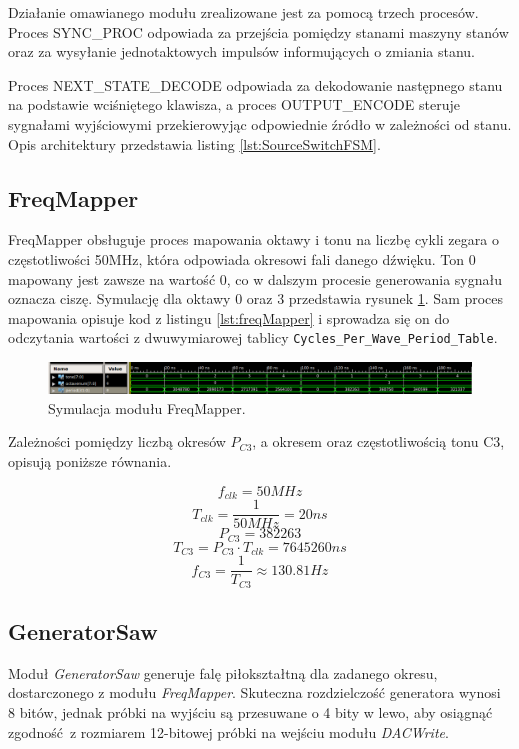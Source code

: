 \documentclass[a4paper,12pt]{article}
\begin{document}
Działanie omawianego modułu zrealizowane jest za pomocą trzech procesów. Proces SYNC\_PROC odpowiada za przejścia pomiędzy stanami maszyny stanów oraz za wysyłanie jednotaktowych impulsów informujących o zmiania stanu. 

Proces NEXT\_STATE\_DECODE odpowiada za dekodowanie następnego stanu na podstawie wciśniętego klawisza, a proces OUTPUT\_ENCODE steruje sygnałami wyjściowymi przekierowyjąc odpowiednie źródło w zależności od stanu. Opis architektury przedstawia listing \ref{lst:SourceSwitchFSM}.


\subsection{FreqMapper}
FreqMapper obsługuje proces mapowania oktawy i tonu na liczbę cykli zegara o częstotliwości 50MHz, która odpowiada okresowi fali danego dźwięku. Ton 0 mapowany jest zawsze na wartość 0, co w dalszym procesie generowania sygnału oznacza ciszę. Symulację dla oktawy 0 oraz 3 przedstawia rysunek \ref{sim:mapper}. Sam proces mapowania opisuje kod z listingu \ref{lst:freqMapper} i sprowadza się on do odczytania wartości z dwuwymiarowej tablicy \lstinline{Cycles_Per_Wave_Period_Table}.
\begin{figure}[h]
  \centering
  \includegraphics[decodearray={1 0 1 0 1 0}, width=\linewidth]{images/mapper}
  \caption{Symulacja modułu FreqMapper.}
  \label{sim:mapper}
\end{figure}

Zależności pomiędzy liczbą okresów $P_{C3}$, a okresem oraz częstotliwością tonu C3, opisują poniższe równania.

\[ f_{clk} = 50MHz \]
\[ T_{clk} = \frac{1}{50MHz} = 20ns \]
\[ P_{C3} = 382263 \]
\[ T_{C3} = P_{C3} \cdot T_{clk} = 7645260ns \]
\[ f_{C3} = \frac{1}{T_{C3}} \approx 130.81Hz \]




\subsection{GeneratorSaw}

Moduł \textit{GeneratorSaw} generuje falę piłokształtną dla zadanego okresu, dostarczonego z modułu \textit{FreqMapper}. Skuteczna rozdzielczość generatora wynosi 8 bitów, jednak próbki na wyjściu są przesuwane o 4 bity w lewo, aby osiągnąć zgodność z rozmiarem 12-bitowej próbki na wejściu modułu \textit{DACWrite}.
\end{document}
